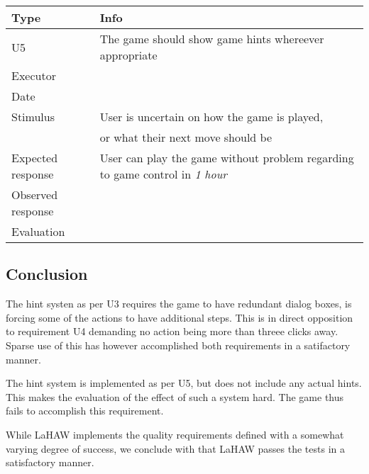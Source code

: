 \vspace{0.5em}

\noindent
\begin{tabular}{|p{3cm}|p{8.5cm}|}
	\hline
	\bf{Type}	& \bf{Info} \\
	\hline
	U5			& The game should show game hints whereever appropriate \\
	Executor	&  \\
	Date		& \date{\today} \\
	Stimulus	& User is uncertain on how the game is played, \\
             & or what their next move should be \\
	Expected response & User can play the game without problem regarding to game control in \emph{1 hour}\\
	Observed response & \\
	Evaluation	&  \\
	\hline
\end{tabular}


	\subsection{Conclusion}

	The hint systen as per U3 requires the game to have redundant dialog boxes, is forcing some of the actions to have additional steps. This is in direct opposition to requirement U4 demanding no action being more than threee clicks away. Sparse use of this has however accomplished both requirements in a satifactory manner.

	The hint system is implemented as per U5, but does not include any actual hints. This makes the evaluation of the effect of such a system hard. The game thus fails to accomplish this requirement.

	While LaHAW implements the quality requirements defined with a somewhat varying degree of success, we conclude with that LaHAW passes the tests in a satisfactory manner.
